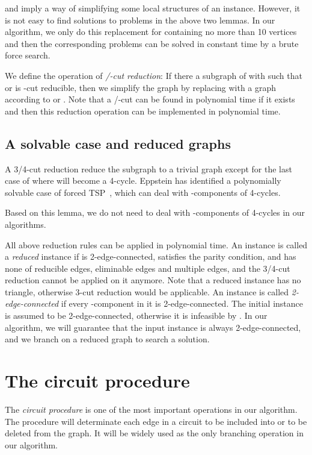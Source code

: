 \documentclass[runningheads]{llncs}
\begin{document}
 and  imply a way of simplifying some local structures of an instance. However, it is not easy to find solutions to problems  in the above two lemmas. In our algorithm, we only do this replacement for  containing no more than 10 vertices and then the corresponding problems  can be solved in constant time by a brute force search.

We define the operation of \emph{/-cut reduction}: If there a subgraph  of  with  such that   or  is -cut reducible, then we simplify the graph by replacing  with a graph according to   or . Note that a /-cut can be found in polynomial time if it exists and then this reduction operation can be implemented in polynomial time.

\subsection{A solvable case and reduced graphs}
A 3/4-cut reduction reduce the subgraph  to a trivial graph except for the last case of  where  will become a 4-cycle.
Eppstein has identified a polynomially solvable case of forced TSP~\cite{Eppstein:TSP3}, which can deal with -components of 4-cycles.


Based on this lemma, we do not need to deal with -components of 4-cycles in our algorithms.

\bigskip
All above reduction rules can be applied in polynomial time. An instance  is called a \emph{reduced} instance if
 is 2-edge-connected,  satisfies the parity condition, and
  has none of reducible edges, eliminable edges and multiple edges, and the 3/4-cut reduction cannot be applied on it anymore.
Note that a reduced instance has no triangle, otherwise 3-cut reduction would be applicable.
An instance is called {\em 2-edge-connected}
if
every -component in it is 2-edge-connected.
The initial instance  is assumed to be 2-edge-connected, otherwise
it is infeasible by .
In our algorithm, we will guarantee that the input instance is always 2-edge-connected,
and we branch on a reduced graph to search a solution.







\section{The circuit procedure}
The \emph{circuit procedure} is one of the most important operations in our algorithm.
The procedure will determinate each edge in a circuit to be included into  or to be deleted from the graph.
It will be widely used as the only branching operation in our algorithm.
\end{document}

